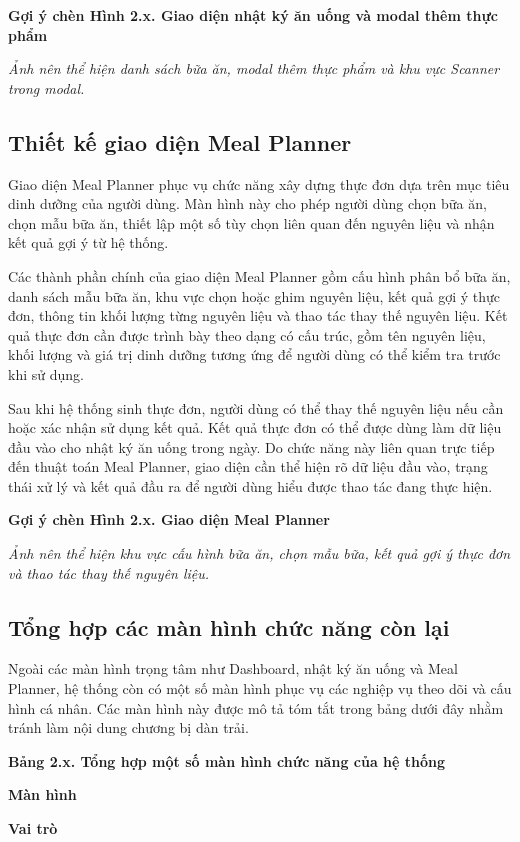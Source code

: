 \documentclass[12pt, a4paper]{report}
\begin{document}
\textbf{Gợi ý chèn Hình 2.x. Giao diện nhật ký ăn uống và modal thêm thực phẩm}

\textit{Ảnh nên thể hiện danh sách bữa ăn, modal thêm thực phẩm và khu vực Scanner trong modal.}

\subsection{Thiết kế giao diện Meal Planner}Giao diện Meal Planner phục vụ chức năng xây dựng thực đơn dựa trên mục tiêu dinh dưỡng của người dùng. Màn hình này cho phép người dùng chọn bữa ăn, chọn mẫu bữa ăn, thiết lập một số tùy chọn liên quan đến nguyên liệu và nhận kết quả gợi ý từ hệ thống.

Các thành phần chính của giao diện Meal Planner gồm cấu hình phân bổ bữa ăn, danh sách mẫu bữa ăn, khu vực chọn hoặc ghim nguyên liệu, kết quả gợi ý thực đơn, thông tin khối lượng từng nguyên liệu và thao tác thay thế nguyên liệu. Kết quả thực đơn cần được trình bày theo dạng có cấu trúc, gồm tên nguyên liệu, khối lượng và giá trị dinh dưỡng tương ứng để người dùng có thể kiểm tra trước khi sử dụng.

Sau khi hệ thống sinh thực đơn, người dùng có thể thay thế nguyên liệu nếu cần hoặc xác nhận sử dụng kết quả. Kết quả thực đơn có thể được dùng làm dữ liệu đầu vào cho nhật ký ăn uống trong ngày. Do chức năng này liên quan trực tiếp đến thuật toán Meal Planner, giao diện cần thể hiện rõ dữ liệu đầu vào, trạng thái xử lý và kết quả đầu ra để người dùng hiểu được thao tác đang thực hiện.

\textbf{Gợi ý chèn Hình 2.x. Giao diện Meal Planner}

\textit{Ảnh nên thể hiện khu vực cấu hình bữa ăn, chọn mẫu bữa, kết quả gợi ý thực đơn và thao tác thay thế nguyên liệu.}

\subsection{Tổng hợp các màn hình chức năng còn lại}Ngoài các màn hình trọng tâm như Dashboard, nhật ký ăn uống và Meal Planner, hệ thống còn có một số màn hình phục vụ các nghiệp vụ theo dõi và cấu hình cá nhân. Các màn hình này được mô tả tóm tắt trong bảng dưới đây nhằm tránh làm nội dung chương bị dàn trải.

\textbf{Bảng 2.x. Tổng hợp một số màn hình chức năng của hệ thống}

\textbf{Màn hình}

\textbf{Vai trò}
\end{document}
